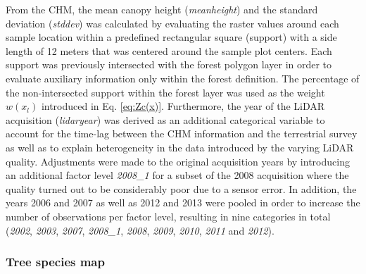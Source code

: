 From the CHM, the mean canopy height (\textit{meanheight}) and the standard deviation (\textit{stddev}) was calculated by evaluating the raster values around each sample location within a predefined rectangular square (support) with a side length of 12 meters that was centered around the sample plot centers. Each support was previously intersected with the forest polygon layer in order to evaluate auxiliary information only within the forest definition. The percentage of the non-intersected support within the forest layer was used as the weight $w(x_l)$ introduced in  Eq. \ref{eq:Zc(x)}. Furthermore, the year of the LiDAR acquisition (\textit{lidaryear}) was derived as an additional categorical variable to account for the time-lag between the CHM information and the terrestrial survey as well as to explain heterogeneity in the data introduced by the varying LiDAR quality. Adjustments were made to the original acquisition years by introducing an additional factor level \textit{2008\_1} for a subset of the 2008 acquisition where the quality turned out to be considerably poor due to a sensor error. In addition, the years 2006 and 2007 as well as 2012 and 2013 were pooled in order to increase the number of observations per factor level, resulting in nine categories in total (\textit{2002}, \textit{2003}, \textit{2007}, \textit{2008\_1}, \textit{2008}, \textit{2009}, \textit{2010}, \textit{2011} and \textit{2012}).

\subsubsection{Tree species map}

